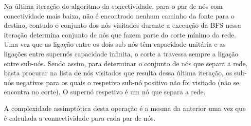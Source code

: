 \documentclass[12pt,a4paper]{article}
\begin{document}
Na última iteração do algoritmo da conectividade, para o par de nós com conectividade mais baixa, não é encontrado nenhum caminho da fonte para o destino, contudo o conjunto dos nós visitados durante a execução da BFS nessa iteração determina conjunto de nós que fazem parte do corte mínimo da rede. Uma vez que as ligação entre os dois sub-nós têm capacidade unitária e as ligações entre supernós capacidade infinita, o corte a travessa sempre a ligação entre sub-nós. Sendo assim, para determinar o conjunto de nós que separa a rede, basta procurar na lista de nós visitados que resulta dessa última iteração, os sub-nós negativos para os quais o respetivo sub-nó positivo não foi visitado (não se encontra no corte). O supernó respetivo é um nó que separa a rede.

A complexidade assimptótica desta operação é a mesma da anterior uma vez que é calculada a connectividade para cada par de nós.
\end{document}
